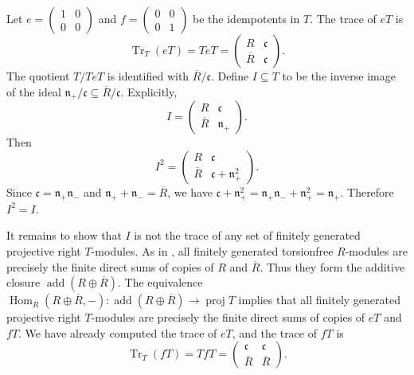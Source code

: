 \documentclass[a4paper,10pt,reqno]{amsart}
\theoremstyle{definition}
\theoremstyle{plain}
\numberwithin{equation}{section}
\newcommand{\kc}{\mathfrak{c}}
\DeclareMathOperator{\Hom}{Hom}
\DeclareMathOperator{\proj}{proj}
\DeclareMathOperator{\add}{add}
\DeclareMathOperator{\Tr}{Tr}
\newcommand{\np}{\mathfrak{n}_{+}}
\newcommand{\nm}{\mathfrak{n}_{-}}
\begin{document}
Let $e=\begin{pmatrix}1 & 0 \\ 0 & 0\end{pmatrix}$ and $f=\begin{pmatrix}0 & 0 \\ 0 & 1\end{pmatrix}$ be the idempotents in $T$. The trace of $eT$ is
\begin{equation*}
\Tr_{T}(eT)=TeT=
\begin{pmatrix}
R & \kc\\
\overline{R} & \kc
\end{pmatrix}.
\end{equation*}
The quotient $T/TeT$ is identified with $\overline{R}/\kc$. Define $I\subseteq T$ to be the inverse image of the ideal $\np/\kc\subseteq\overline{R}/\kc$. Explicitly,
\begin{equation*}
I=
\begin{pmatrix}
R & \kc\\
\overline{R} & \np
\end{pmatrix}.
\end{equation*}
Then
\begin{equation*}
I^{2}=
\begin{pmatrix}
R & \kc\\
\overline{R} & \kc+\np^{2}
\end{pmatrix}.
\end{equation*}
Since $\kc=\np\nm$ and $\np+\nm=\overline{R}$, we have $\kc+\np^{2}=\np\nm+\np^{2}=\np$. Therefore $I^{2}=I$.

It remains to show that $I$ is not the trace of any set of finitely generated projective right $T$-modules. As in \cite[Section~8]{MR4915561}, all finitely generated torsionfree $R$-modules are precisely the finite direct sums of copies of $R$ and $\overline{R}$. Thus they form the additive closure $\add(R\oplus\overline{R})$. The equivalence $\Hom_{R}(R\oplus\overline{R},-)\colon\add(R\oplus\overline{R})\to\proj T$ implies that all finitely generated projective right $T$-modules are precisely the finite direct sums of copies of $eT$ and $fT$. We have already computed the trace of $eT$, and the trace of $fT$ is
\begin{equation*}
\Tr_{T}(fT)=TfT=
\begin{pmatrix}
\kc & \kc\\
\overline{R} & \overline{R}
\end{pmatrix}.
\end{equation*}
\end{document}
